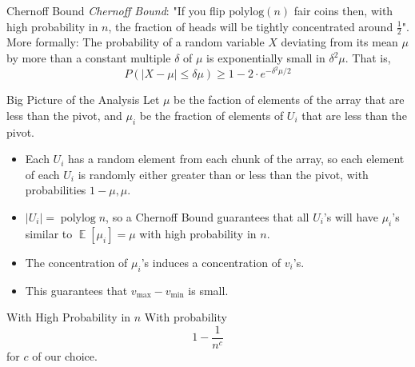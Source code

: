 \documentclass[xcolor=x11names, svgnames, rgb]{beamer}
\newcommand{\polylog}{\operatorname{polylog}}
\def\E{\operatorname{\mathbb{E}}}
\begin{document}
\begin{frame}[t]{Chernoff Bound}
	\vspace{0.5cm}
	\emph{Chernoff Bound}: "If you flip $\text{polylog}(n)$ fair coins then, with high
	probability in $n$, the fraction of heads will be tightly concentrated around
	$\frac{1}{2}$".\\

	\vspace{0.5cm}
	More formally:
	The probability of a random variable $X$ deviating from its mean $\mu$ by more than a constant multiple $\delta$ of $\mu$ is exponentially small in $\delta^2 \mu$. That is, 
	$$P(|X - \mu | \le \delta \mu ) \ge 1- 2\cdot e^{-\delta^2 \mu /2} $$

\end{frame}


\begin{frame}[t]{Big Picture of the Analysis}
	Let $\mu$ be the faction of elements of the array that are less than the pivot, and $\mu_i$ be the fraction of elements of $U_i$ that are less than the pivot.
	\begin{itemize}
		\item Each $U_i$ has a random element from each chunk of the array, so each
			element of each $U_i$ is randomly either greater than or less than the
			pivot, with probabilities $1-\mu, \mu$.
		\item $|U_i| = \polylog n$, so a Chernoff Bound guarantees that all $U_i$'s
			will have $\mu_i$'s similar to $\E[\mu_i] = \mu$ with high probability in $n$.
		\item The concentration of $\mu_i$'s induces a concentration of $v_i$'s. 
		\item This guarantees that $v_{\max} - v_{\min}$ is small. 
	\end{itemize}
\end{frame}

\begin{frame}[t]{With High Probability in $n$}
With probability 	
	$$1- \frac{1}{n^c}$$
	for $c$ of our choice.
\end{frame}



\end{document}
